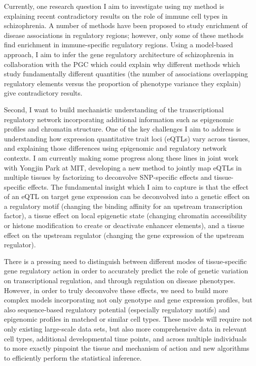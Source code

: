 \documentclass[11pt]{article}
\begin{document}
Currently, one research question I aim to investigate using my method is
explaining recent contradictory results on the role of immune cell types in
schizophrenia. A number of methods have been proposed to study enrichment of
disease associations in regulatory regions; however, only some of these methods
find enrichment in immune-specific regulatory regions. Using a model-based
approach, I aim to infer the gene regulatory architecture of schizophrenia in
collaboration with the PGC which could explain why different methods which
study fundamentally different quantities (the number of associations
overlapping regulatory elements versus the proportion of phenotype variance
they explain) give contradictory results.

Second, I want to build mechanistic understanding of the transcriptional
regulatory network incorporating additional information such as epigenomic
profiles and chromatin structure. One of the key challenges I aim to address is
understanding how expression quantitative trait loci (eQTLs) vary across
tissues, and explaining those differences using epigenomic and regulatory
network contexts. I am currently making some progress along these lines in
joint work with Yongjin Park at MIT, developing a new method to jointly map
eQTLs in multiple tissues by factorizing to deconvolve SNP-specific effects and
tissue-specific effects. The fundamental insight which I aim to capture is that
the effect of an eQTL on target gene expression can be deconvolved into a
genetic effect on a regulatory motif (changing the binding affinity for an
upstream transcription factor), a tissue effect on local epigenetic state
(changing chromatin accessibility or histone modification to create or
deactivate enhancer elements), and a tissue effect on the upstream regulator
(changing the gene expression of the upstream regulator).

There is a pressing need to distinguish between different modes of
tissue-specific gene regulatory action in order to accurately predict the role
of genetic variation on transcriptional regulation, and through regulation on
disease phenotypes. However, in order to truly deconvolve these effects, we
need to build more complex models incorporating not only genotype and gene
expression profiles, but also sequence-based regulatory potential (especially
regulatory motifs) and epigenomic profiles in matched or similar cell types.
These models will require not only existing large-scale data sets, but also
more comprehensive data in relevant cell types, additional developmental time
points, and across multiple individuals to more exactly pinpoint the tissue and
mechanism of action and new algorithms to efficiently perform the statistical
inference.
\end{document}
